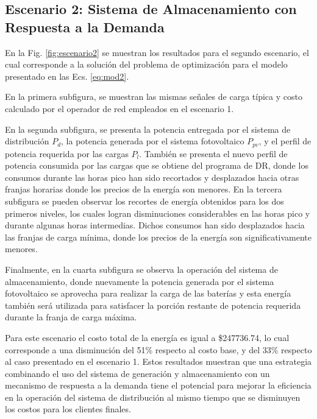 \subsection{Escenario 2: Sistema de Almacenamiento con Respuesta a la Demanda}\label{sec:escenario2}
En la Fig. \ref{fig:escenario2} se muestran los resultados para el segundo escenario, el cual corresponde a la solución del problema de optimización para el modelo presentado en las Ecs. \eqref{eq:mod2}.

En la primera subfigura, se muestran las mismas señales de carga típica y costo calculado por el operador de red empleados en el escenario 1.

En la segunda subfigura, se presenta la potencia entregada por el sistema de distribución $P_d$, la potencia generada por el sistema fotovoltaico $P_{pv}$, y el perfil de potencia requerida por las cargas $P_l$. También se presenta el nuevo perfil de potencia consumida por las cargas que se obtiene del programa de DR, donde los consumos durante las horas pico han sido recortados y desplazados hacia otras franjas horarias donde los precios de la energía son menores. En la tercera subfigura se pueden observar los recortes de energía obtenidos para los dos primeros niveles, los cuales logran disminuciones considerables en las horas pico y durante algunas horas intermedias. Dichos consumos han sido desplazados hacia las franjas de carga mínima, donde los precios de la energía son significativamente menores.

Finalmente, en la cuarta subfigura se observa la operación del sistema de almacenamiento, donde nuevamente la potencia generada por el sistema fotovoltaico se aprovecha para realizar la carga de las baterías y esta energía también será utilizada para satisfacer la porción restante de potencia requerida durante la franja de carga máxima. 

Para este escenario el costo total de la energía es igual a \$247736.74, lo cual corresponde a una disminución del 51\% respecto al costo base, y del 33\% respecto al caso presentado en el escenario 1. Estos resultados muestran que una estrategia combinando el uso del sistema de generación y almacenamiento con un mecanismo de respuesta a la demanda tiene el potencial para mejorar la eficiencia en la operación del sistema de distribución al mismo tiempo que se  disminuyen los costos para los clientes finales.

